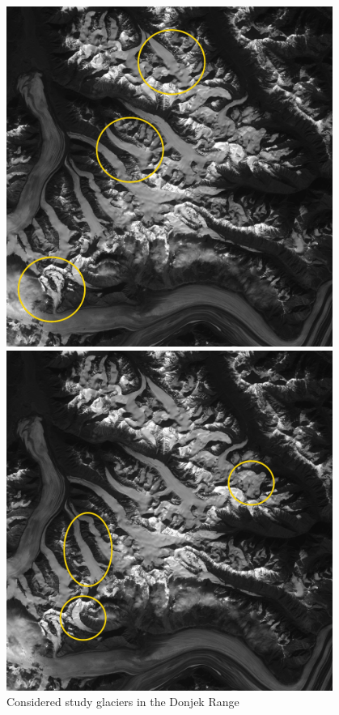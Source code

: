 \documentclass[12pt]{article}
\begin{document}
\begin{figure}
\begin{minipage}[c][20cm][t]{.5\textwidth}
\end{minipage}%
\begin{minipage}[c][20cm][t]{.5\textwidth}
	\vspace*{\fill}
  \centering
  \includegraphics[width=0.95\textwidth]{donjeck_2.jpg}
  \par\vfill
  \includegraphics[width=0.95\textwidth]{donjeck_3.jpg}
\end{minipage}%

\caption{Considered study glaciers in the Donjek Range}
\label{donjek}
\end{figure}
\end{document}
